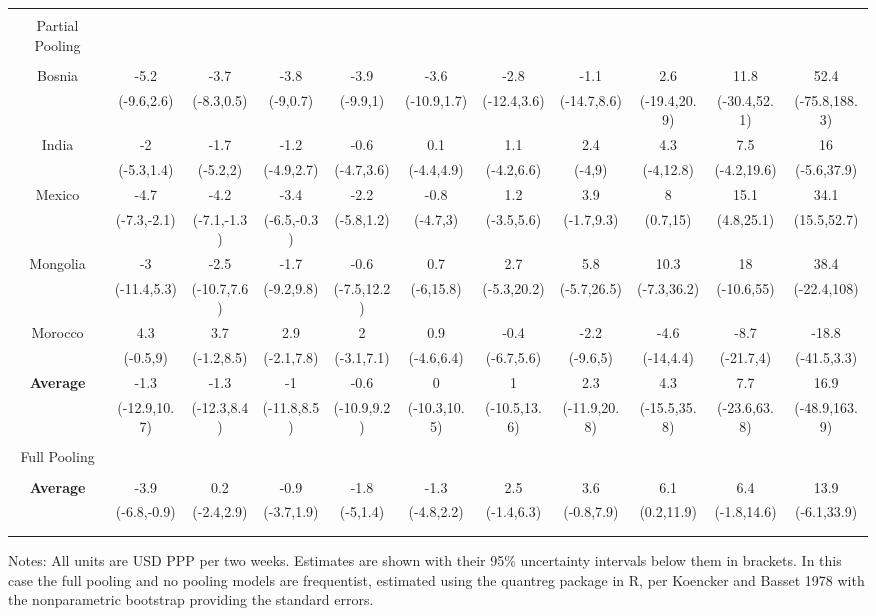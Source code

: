 \documentclass[AER]{AEA}
\begin{document}
\begin{table}[!htbp]
\begin{tabular}{@{\extracolsep{0pt}} ccccccccccc}
\hline \\[-1.8ex]
Partial Pooling &&&&&&&&&& \\
\hline \\[-1.8ex]
Bosnia & -5.2 & -3.7 & -3.8 & -3.9 & -3.6 & -2.8 & -1.1 & 2.6 & 11.8 & 52.4 \\ 
& (-9.6,2.6) & (-8.3,0.5) & (-9,0.7) & (-9.9,1) & (-10.9,1.7) & (-12.4,3.6) & (-14.7,8.6) & (-19.4,20.9) & (-30.4,52.1) & (-75.8,188.3) \\ 
India & -2 & -1.7 & -1.2 & -0.6 & 0.1 & 1.1 & 2.4 & 4.3 & 7.5 & 16 \\ 
& (-5.3,1.4) & (-5.2,2) & (-4.9,2.7) & (-4.7,3.6) & (-4.4,4.9) & (-4.2,6.6) & (-4,9) & (-4,12.8) & (-4.2,19.6) & (-5.6,37.9) \\ 
 Mexico &  -4.7 & -4.2 & -3.4 & -2.2 & -0.8 & 1.2 & 3.9 & 8 & 15.1 & 34.1 \\ 
 &  (-7.3,-2.1) & (-7.1,-1.3) & (-6.5,-0.3) & (-5.8,1.2) & (-4.7,3) & (-3.5,5.6) & (-1.7,9.3) & (0.7,15) & (4.8,25.1) & (15.5,52.7) \\ 
Mongolia &  -3 & -2.5 & -1.7 & -0.6 & 0.7 & 2.7 & 5.8 & 10.3 & 18 & 38.4 \\ 
 &(-11.4,5.3) & (-10.7,7.6) & (-9.2,9.8) & (-7.5,12.2) & (-6,15.8) & (-5.3,20.2) & (-5.7,26.5) & (-7.3,36.2) & (-10.6,55) & (-22.4,108) \\ 
 Morocco &  4.3 & 3.7 & 2.9 & 2 & 0.9 & -0.4 & -2.2 & -4.6 & -8.7 & -18.8 \\ 
& (-0.5,9) & (-1.2,8.5) & (-2.1,7.8) & (-3.1,7.1) & (-4.6,6.4) & (-6.7,5.6) & (-9.6,5) & (-14,4.4) & (-21.7,4) & (-41.5,3.3) \\ 
\hline
\textbf{Average} & -1.3 & -1.3 & -1 & -0.6 & 0 & 1 & 2.3 & 4.3 & 7.7 & 16.9 \\ 
 & (-12.9,10.7) & (-12.3,8.4) & (-11.8,8.5) & (-10.9,9.2) & (-10.3,10.5) & (-10.5,13.6) & (-11.9,20.8) & (-15.5,35.8) & (-23.6,63.8) & (-48.9,163.9) \\ 
 \hline \\[-1.8ex]
Full Pooling &&&&&&&&&& \\
\hline \\[-1.8ex]
\textbf{Average}  & -3.9 & 0.2 & -0.9 & -1.8 & -1.3 & 2.5 & 3.6 & 6.1 & 6.4 & 13.9 \\
 &  (-6.8,-0.9) & (-2.4,2.9) & (-3.7,1.9) & (-5,1.4) & (-4.8,2.2) & (-1.4,6.3) & (-0.8,7.9) & (0.2,11.9) & (-1.8,14.6) & (-6.1,33.9) \\ 

\hline \\[-1.8ex]

\hline \\[-1.8ex]

\end{tabular}
\raggedright{\small Notes: All units are USD PPP per two weeks. Estimates are shown with their 95\% uncertainty intervals below them in brackets. In this case the full pooling and no pooling models are frequentist, estimated using the quantreg package in R, per Koencker and Basset 1978 with the nonparametric bootstrap providing the standard errors.}

\end{table}
\end{document}
